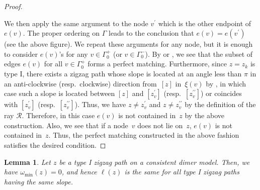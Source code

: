 \documentclass[11pt]{article}
\numberwithin{equation}{section}
\numberwithin{equation}{section}
\numberwithin{figure}{section}
\numberwithin{table}{section}
\newtheorem{Lemma}[Theorem]{Lemma}
\newcommand{\calR}{\mathcal{R}}
\begin{document}
\begin{proof}
\begin{center}
{{
} }
\end{center}

We then apply the same argument to the node $v^\prime$ which is the other endpoint of $e(v)$.
The proper ordering on $\Gamma$ leads to the conclusion that $e(v)=e(v^\prime)$ (see the above figure).
We repeat these arguments for any node, but it is enough to consider $e(v)$'s for any $v\in\Gamma^+_0$ (or $v\in\Gamma^-_0$).
By \cite[Section~3.2]{Gul} or \cite[Lemma~4.19]{Bro}, we see that the subset of edges $e(v)$ for all $v\in\Gamma^+_0$ forms a perfect matching.
Furthermore, since $z=z_k$ is type I, there exists a zigzag path whose slope is located at an angle less than $\pi$ in an anti-clockwise (resp.\ clockwise) direction from~$[z]$ in~$\xi(v)$ by \cite[Lemma~4.11 and its proof]{Bro}, in which case such a slope is located between $[z]$ and $[z^\prime_v]$ (resp.~$[z^{\prime\prime}_v]$) or coincides with $[z^\prime_v]$ (resp.~$[z^{\prime\prime}_v]$). Thus, we have $z\neq z^\prime_v$ and $z\neq z^{\prime\prime}_v$ by the definition of the ray $\calR$.
Therefore, in this case $e(v)$ is not contained in~$z$ by the above construction.
Also, we see that if a node~$v$ does not lie on~$z$, $e(v)$ is not contained in~$z$.
Thus, the perfect matching constructed in the above fashion satisfies the desired condition.
\end{proof}

\begin{Lemma}\label{lem_same_length}
Let $z$ be a type I zigzag path on a consistent dimer model.
Then, we have $\omega_{\min}(z)=0$, and hence $\ell(z)$ is the same for all type I zigzag paths having the same slope.
\end{Lemma}
\end{document}
